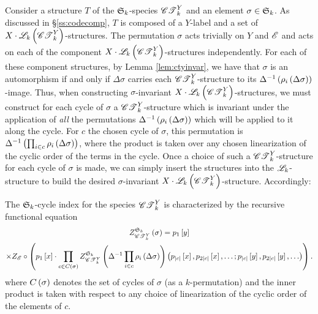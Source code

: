 \documentclass[distribution,draft]{brandiss} %
\numberwithin{section}{chapter}
\numberwithin{figure}{chapter}
\begin{document}
Consider a structure $T$ of the $ \mathfrak{S}_{k} $-species $\mathscr{CT}_{k}^{Y}$ and an element $\sigma \in  \mathfrak{S}_{k} $.
As discussed in \S \ref{ss:codecomp}, $T$ is composed of a $Y$-label and a set of $X \cdot \mathscr{L}_{k} \left( {\mathscr{CT}_{k}^{Y}} \right)$-structures.
The permutation $\sigma$ acts trivially on $Y$ and $\mathscr{E}$ and acts on each of the component $X \cdot \mathscr{L}_{k} \left( {\mathscr{CT}_{k}^{Y}} \right)$-structures independently.
For each of these component structures, by Lemma \ref{lem:ctyinvar}, we have that $\sigma$ is an automorphism if and only if $\Delta \sigma$ carries each $\mathscr{CT}_{k}^{Y}$-structure to its $\Delta^{-1} \left( {\rho_{i} \left( {\Delta \sigma} \right)} \right)$-image.
Thus, when constructing $\sigma$-invariant $X \cdot \mathscr{L}_{k} \left( {\mathscr{CT}_{k}^{Y}} \right)$-structures, we must construct for each cycle of $\sigma$ a $\mathscr{CT}_{k}^{Y}$-structure which is invariant under the application of \emph{all} the permutations $\Delta^{-1} \left( {\rho_{i} \left( {\Delta \sigma} \right)} \right)$ which will be applied to it along the cycle.
For $c$ the chosen cycle of $\sigma$, this permutation is $\Delta^{-1} \left( {\prod_{i \in c} \rho_{i} \left( {\Delta \sigma} \right)} \right)$, where the product is taken over any chosen linearization of the cyclic order of the terms in the cycle.
Once a choice of such a $\mathscr{CT}_{k}^{Y}$-structure for each cycle of $\sigma$ is made, we can simply insert the structures into the $\mathscr{L}_{k}$-structure to build the desired $\sigma$-invariant $X \cdot \mathscr{L}_{k} \left( {\mathscr{CT}_{k}^{Y}} \right)$-structure.
Accordingly:
\begin{theorem}
  \label{thm:ctyfuncci}
  The $ \mathfrak{S}_{k} $-cycle index for the species $\mathscr{CT}_{k}^{Y}$ is characterized by the recursive functional equation
  \begin{multline}
    \label{eq:ctyfuncci}
     Z_{\mathscr{CT}_{k}^{Y}}^{{ \mathfrak{S}_{k} } {}}  \left( {\sigma} \right) = p_{1} \left[ {y} \right] \\
    \times Z_{\mathscr{E}} \circ \left( {p_{1} \left[ {x} \right] \cdot \prod_{c \in C \left( {\sigma} \right)}  Z_{\mathscr{CT}_{k}^{Y}}^{{ \mathfrak{S}_{k} } {}} \left( {\Delta^{-1} \prod_{i \in c} \rho_{i} \left( {\Delta \sigma} \right)} \right)  \left( {p_{\left\vert {c} \right\vert} \left[ {x} \right], p_{2 \left\vert {c} \right\vert} \left[ {x} \right], \dots; p_{\left\vert {c} \right\vert} \left[ {y} \right], p_{2 \left\vert {c} \right\vert} \left[ {y} \right], \dots} \right)} \right).
  \end{multline}
  where $C \left( {\sigma} \right)$ denotes the set of cycles of $\sigma$ (as a $k$-permutation) and the inner product is taken with respect to any choice of linearization of the cyclic order of the elements of $c$.
\end{theorem}
\end{document}
